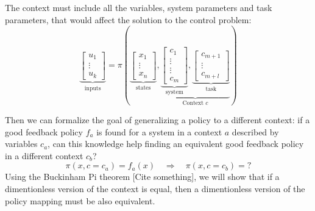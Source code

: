  The context must include all the variables, system parameters and task parameters, that would affect the solution to the control problem:
\begin{equation}
\underbrace{\begin{bmatrix}
u_1 \\
\vdots \\
u_k
\end{bmatrix}}_{\text{inputs}}
=
\pi \left(
\underbrace{\begin{bmatrix}
x_1 \\
\vdots \\
x_n
\end{bmatrix}}_{\text{states}}
,
\underbrace{
\underbrace{\begin{bmatrix}
c_1 \\
\vdots \\
\vdots \\
c_m
\end{bmatrix}}_{\text{system}}
,
\underbrace{\begin{bmatrix}
c_{m+1} \\
\vdots \\
c_{m+l}
\end{bmatrix}}_{\text{task}}
}_{\text{Context $c$}}
\right) 
\label{eq:vectorpolicy}
\end{equation}


Then we can formalize the goal of generalizing a policy to a different context: if a good feedback policy $f_a$ is found for a system in a context $a$ described by variables $c_a$, can this knowledge help finding an equivalent good feedback policy in a different context $c_b$?
\begin{equation}
\pi \left(
x,
c = c_a
\right) = 
f_a \left(
x 
\right) 
\quad \Rightarrow \quad
\pi \left(
x,
c = c_b
\right) = ?
\end{equation}
Using the Buckinham Pi theorem [Cite something], we will show that if a dimentionless version of the context is equal, then a dimentionless version of the policy mapping must be also equivalent.



